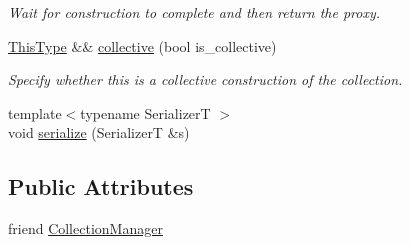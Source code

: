 \begin{DoxyCompactItemize}
\begin{DoxyCompactList}\small\item\em Wait for construction to complete and then return the proxy. \end{DoxyCompactList}\item 
\hyperlink{structvt_1_1vrt_1_1collection_1_1param_1_1_construct_params_a13d4910c0f6825c7b0ddfebce5288bea}{This\+Type} \&\& \hyperlink{structvt_1_1vrt_1_1collection_1_1param_1_1_construct_params_aded96b7d8b93f3ae8b91c419cbce6ddd}{collective} (bool is\+\_\+collective)
\begin{DoxyCompactList}\small\item\em Specify whether this is a collective construction of the collection. \end{DoxyCompactList}\item 
{\footnotesize template$<$typename SerializerT $>$ }\\void \hyperlink{structvt_1_1vrt_1_1collection_1_1param_1_1_construct_params_a315a60ef3b90e398f68a8abf02561b05}{serialize} (SerializerT \&s)
\end{DoxyCompactItemize}
\subsection*{Public Attributes}
\begin{DoxyCompactItemize}
\item 
friend \hyperlink{structvt_1_1vrt_1_1collection_1_1param_1_1_construct_params_a8a00b8a2017cec4453e2be8dd90742c7}{Collection\+Manager}
\end{DoxyCompactItemize}
